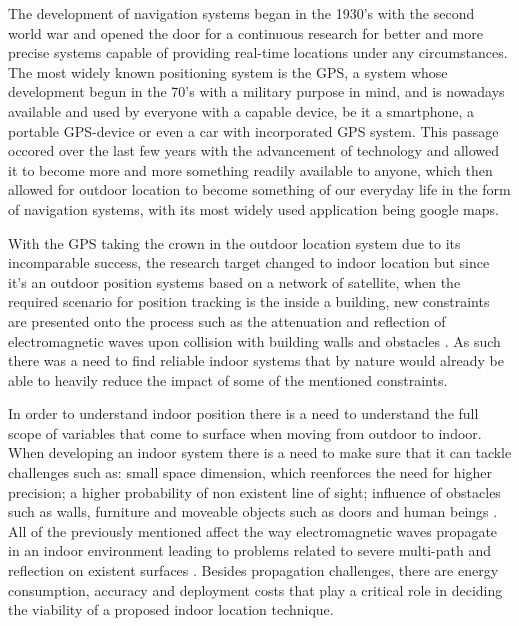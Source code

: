 \label{cap:int}

The development of navigation systems began in the 1930's with the second world war and opened the door for a continuous research for better and more precise systems capable of providing real-time locations under any circumstances. The most widely known positioning system is the \ac{GPS}, a system whose development begun in the 70's with a military purpose in mind, and is nowadays available and used by everyone with a capable device, be it a smartphone, a portable \ac{GPS}-device or even a car with incorporated \ac{GPS} system. This passage occored over the last few years with the advancement of technology and allowed it to become more and more something readily available to anyone, which then allowed for outdoor location to become something of our everyday life in the form of navigation systems, with its most widely used application being google maps.

With the \ac{GPS} taking the crown in the outdoor location system due to its incomparable success, the research target changed to indoor location but since it's an outdoor position systems based on a network of satellite, when the required scenario for position tracking is the inside a building, new constraints are presented onto the process such as the attenuation and reflection of electromagnetic waves upon collision with building walls and obstacles \cite{survey2}. As such there was a need to find reliable indoor systems that by nature would already be able to heavily reduce the impact of some of the mentioned constraints.

In order to understand indoor position there is a need to understand the full scope of variables that come to surface when moving from outdoor to indoor. When developing an indoor system there is a need to make sure that it can tackle challenges such as: small space dimension, which reenforces the need for higher precision; a higher probability of non existent line of sight; influence of obstacles such as walls, furniture and moveable objects such as doors and human beings \cite{reviewtechniques}. All of the previously mentioned affect the way electromagnetic waves propagate in an indoor environment leading to problems related to severe multi-path and reflection on existent surfaces \cite{surveywireless}. Besides propagation challenges, there are energy consumption, accuracy and deployment costs that play a critical role in deciding the viability of a proposed indoor location technique.

